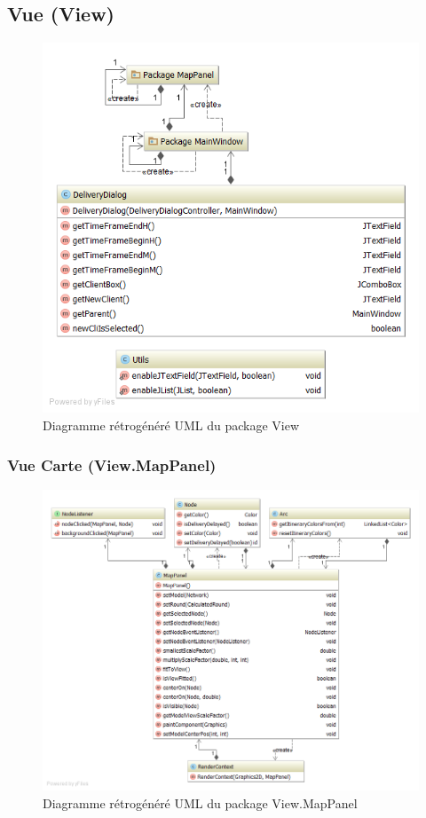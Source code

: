 \subsection{Vue (View)}

\begin{figure}[h]
    \centering
    \includegraphics[width=120mm]{../diagrams/classes_packages/final_classes_packages/view/view.png}
    \caption{Diagramme r\'etrog\'en\'er\'e UML du package View}
    \label{diagram:gen_uml_view}
\end{figure}
\pagebreak

\subsubsection{Vue Carte (View.MapPanel)}

\begin{figure}[h]
    \centering
    \includegraphics[width=160mm]{../diagrams/classes_packages/final_classes_packages/view/package_map.png}
    \caption{Diagramme r\'etrog\'en\'er\'e UML du package View.MapPanel}
    \label{diagram:gen_uml_view_map}
\end{figure}
\pagebreak

